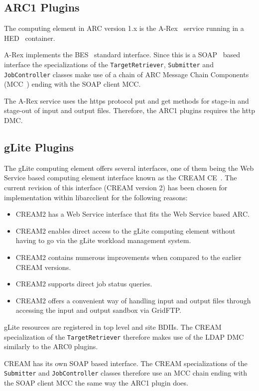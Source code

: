 \documentclass{book}
\newcommand{\libarcclient}{libarcclient}
\newcommand{\JobController}{\texttt{JobController}}
\newcommand{\TargetRetriever}{\texttt{TargetRetriever}}
\newcommand{\Submitter}{\texttt{Submitter}}
\begin{document}
\subsection{ARC1 Plugins}

The computing element in ARC version 1.x is the A-Rex~\cite{arex}
service running in a HED~\cite{hed} container.

A-Rex implements the BES~\cite{ogsa-bes} standard interface. Since
this is a SOAP~\cite{soap} based interface the specializations of the
{\TargetRetriever}, {\Submitter} and {\JobController} classes make use
of a chain of ARC Message Chain Components (MCC~\cite{hed}) ending
with the SOAP client MCC.

The A-Rex service uses the https protocol put and get methods for
stage-in and stage-out of input and output files. Therefore, the ARC1
plugins requires the http DMC.

\subsection{gLite Plugins}

The gLite computing element offers several interfaces, one of them
being the Web Service based computing element interface known as the
CREAM CE~\cite{cream}. The current revision of this interface (CREAM
version 2) has been chosen for implementation within {\libarcclient} for the
following reasons:

\begin{itemize}
\item CREAM2 has a Web Service interface that fits the Web Service
  based ARC.
\item CREAM2 enables direct access to the gLite computing element
  without having to go via the gLite workload management system.
\item CREAM2 contains numerous improvements when compared to the
  earlier CREAM versions.
\item CREAM2 supports direct job status queries.
\item CREAM2 offers a convenient way of handling input and output
  files through accessing the input and output sandbox via GridFTP.
\end{itemize}

gLite resources are registered in top level and site BDIIs. The CREAM
specialization of the {\TargetRetriever} therefore makes use of the
LDAP DMC similarly to the ARC0 plugins.

CREAM has its own SOAP based interface. The CREAM
specializations of the {\Submitter} and {\JobController} classes
therefore use an MCC chain ending with the SOAP client MCC the same 
way the ARC1 plugin does.
\end{document}
